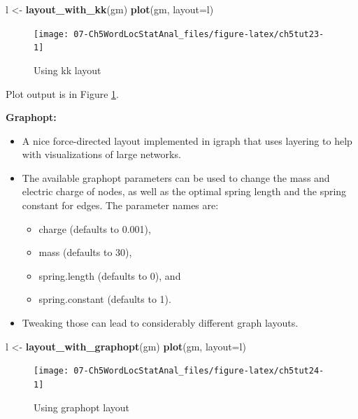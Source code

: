 \documentclass[
]{article}
\newenvironment{Shaded}{\begin{snugshade}}{\end{snugshade}}
\newcommand{\AttributeTok}[1]{\textcolor[rgb]{0.13,0.29,0.53}{#1}}
\newcommand{\FunctionTok}[1]{\textcolor[rgb]{0.13,0.29,0.53}{\textbf{#1}}}
\newcommand{\NormalTok}[1]{#1}
\newcommand{\OtherTok}[1]{\textcolor[rgb]{0.56,0.35,0.01}{#1}}
\providecommand{\tightlist}{%
  \setlength{\itemsep}{0pt}\setlength{\parskip}{0pt}}
\begin{document}
\begin{Shaded}
\begin{Highlighting}[]
\NormalTok{l }\OtherTok{\textless{}{-}} \FunctionTok{layout\_with\_kk}\NormalTok{(gm)}
\FunctionTok{plot}\NormalTok{(gm, }\AttributeTok{layout=}\NormalTok{l)}
\end{Highlighting}
\end{Shaded}

\begin{figure}

{\centering \texttt{[image: 07-Ch5WordLocStatAnal\_files/figure-latex/ch5tut23-1]} 

}

\caption{Using kk layout}\label{fig:ch5tut23}
\end{figure}

Plot output is in Figure \ref{fig:ch5tut23}.

\textbf{Graphopt:}

\begin{itemize}
\tightlist
\item
  A nice force-directed layout implemented in igraph that uses layering to help with visualizations of large networks.
\item
  The available graphopt parameters can be used to change the mass and electric charge of nodes, as well as the optimal spring length and the spring constant for edges. The parameter names are:

  \begin{itemize}
  \tightlist
  \item
    charge (defaults to 0.001),
  \item
    mass (defaults to 30),
  \item
    spring.length (defaults to 0), and
  \item
    spring.constant (defaults to 1).
  \end{itemize}
\item
  Tweaking those can lead to considerably different graph layouts.
\end{itemize}

\begin{Shaded}
\begin{Highlighting}[]
\NormalTok{l }\OtherTok{\textless{}{-}} \FunctionTok{layout\_with\_graphopt}\NormalTok{(gm)}
\FunctionTok{plot}\NormalTok{(gm, }\AttributeTok{layout=}\NormalTok{l)}
\end{Highlighting}
\end{Shaded}

\begin{figure}

{\centering \texttt{[image: 07-Ch5WordLocStatAnal\_files/figure-latex/ch5tut24-1]} 

}

\caption{Using graphopt layout}\label{fig:ch5tut24}
\end{figure}
\end{document}
